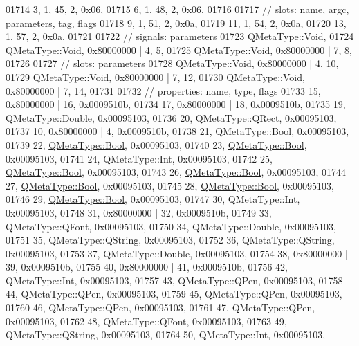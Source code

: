 \begin{DoxyCode}
01714        3,    1,   45,    2, 0x06,
01715        6,    1,   48,    2, 0x06,
01716 
01717  \textcolor{comment}{// slots: name, argc, parameters, tag, flags}
01718        9,    1,   51,    2, 0x0a,
01719       11,    1,   54,    2, 0x0a,
01720       13,    1,   57,    2, 0x0a,
01721 
01722  \textcolor{comment}{// signals: parameters}
01723     QMetaType::Void,
01724     QMetaType::Void, 0x80000000 | 4,    5,
01725     QMetaType::Void, 0x80000000 | 7,    8,
01726 
01727  \textcolor{comment}{// slots: parameters}
01728     QMetaType::Void, 0x80000000 | 4,   10,
01729     QMetaType::Void, 0x80000000 | 7,   12,
01730     QMetaType::Void, 0x80000000 | 7,   14,
01731 
01732  \textcolor{comment}{// properties: name, type, flags}
01733       15, 0x80000000 | 16, 0x0009510b,
01734       17, 0x80000000 | 18, 0x0009510b,
01735       19, QMetaType::Double, 0x00095103,
01736       20, QMetaType::QRect, 0x00095103,
01737       10, 0x80000000 | 4, 0x0009510b,
01738       21, \hyperlink{a00004_a76a8b016e5ad61faf9062cc387df5016}{QMetaType::Bool}, 0x00095103,
01739       22, \hyperlink{a00004_a76a8b016e5ad61faf9062cc387df5016}{QMetaType::Bool}, 0x00095103,
01740       23, \hyperlink{a00004_a76a8b016e5ad61faf9062cc387df5016}{QMetaType::Bool}, 0x00095103,
01741       24, QMetaType::Int, 0x00095103,
01742       25, \hyperlink{a00004_a76a8b016e5ad61faf9062cc387df5016}{QMetaType::Bool}, 0x00095103,
01743       26, \hyperlink{a00004_a76a8b016e5ad61faf9062cc387df5016}{QMetaType::Bool}, 0x00095103,
01744       27, \hyperlink{a00004_a76a8b016e5ad61faf9062cc387df5016}{QMetaType::Bool}, 0x00095103,
01745       28, \hyperlink{a00004_a76a8b016e5ad61faf9062cc387df5016}{QMetaType::Bool}, 0x00095103,
01746       29, \hyperlink{a00004_a76a8b016e5ad61faf9062cc387df5016}{QMetaType::Bool}, 0x00095103,
01747       30, QMetaType::Int, 0x00095103,
01748       31, 0x80000000 | 32, 0x0009510b,
01749       33, QMetaType::QFont, 0x00095103,
01750       34, QMetaType::Double, 0x00095103,
01751       35, QMetaType::QString, 0x00095103,
01752       36, QMetaType::QString, 0x00095103,
01753       37, QMetaType::Double, 0x00095103,
01754       38, 0x80000000 | 39, 0x0009510b,
01755       40, 0x80000000 | 41, 0x0009510b,
01756       42, QMetaType::Int, 0x00095103,
01757       43, QMetaType::QPen, 0x00095103,
01758       44, QMetaType::QPen, 0x00095103,
01759       45, QMetaType::QPen, 0x00095103,
01760       46, QMetaType::QPen, 0x00095103,
01761       47, QMetaType::QPen, 0x00095103,
01762       48, QMetaType::QFont, 0x00095103,
01763       49, QMetaType::QString, 0x00095103,
01764       50, QMetaType::Int, 0x00095103,

\end{DoxyCode}
